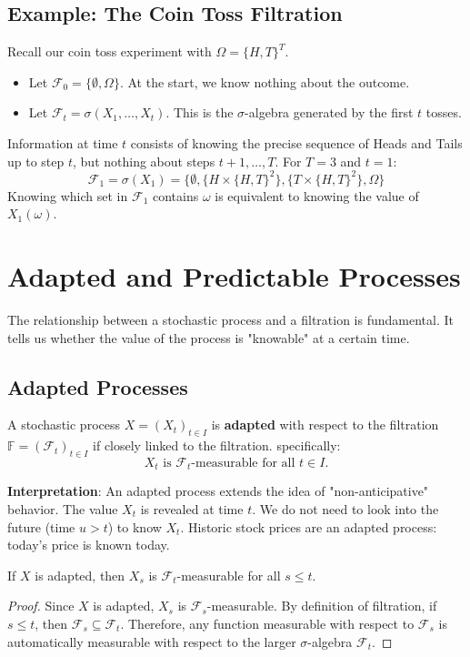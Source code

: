 \subsection{Example: The Coin Toss Filtration}
Recall our coin toss experiment with $\Omega = \{H, T\}^T$.
\begin{itemize}
    \item Let $\mathcal{F}_0 = \{ \emptyset, \Omega \}$. At the start, we know nothing about the outcome.
    \item Let $\mathcal{F}_t = \sigma(X_1, \dots, X_t)$. This is the $\sigma$-algebra generated by the first $t$ tosses.
\end{itemize}
Information at time $t$ consists of knowing the precise sequence of Heads and Tails up to step $t$, but nothing about steps $t+1, \dots, T$.
For $T=3$ and $t=1$:
\[
\mathcal{F}_1 = \sigma(X_1) = \{ \emptyset, \{H \times \{H,T\}^2\}, \{T \times \{H,T\}^2\}, \Omega \}
\]
Knowing which set in $\mathcal{F}_1$ contains $\omega$ is equivalent to knowing the value of $X_1(\omega)$.

\section{Adapted and Predictable Processes}

The relationship between a stochastic process and a filtration is fundamental. It tells us whether the value of the process is "knowable" at a certain time.

\subsection{Adapted Processes}
\begin{definition}
A stochastic process $X = (X_t)_{t \in I}$ is \textbf{adapted} with respect to the filtration $\mathbb{F} = (\mathcal{F}_t)_{t \in I}$ if closely linked to the filtration. specifically:
\[
X_t \text{ is } \mathcal{F}_t\text{-measurable for all } t \in I.
\]
\end{definition}

\textbf{Interpretation}: An adapted process extends the idea of "non-anticipative" behavior. The value $X_t$ is revealed at time $t$. We do not need to look into the future (time $u > t$) to know $X_t$. Historic stock prices are an adapted process: today's price is known today.

\begin{proposition}
If $X$ is adapted, then $X_s$ is $\mathcal{F}_t$-measurable for all $s \le t$.
\end{proposition}
\begin{proof}
Since $X$ is adapted, $X_s$ is $\mathcal{F}_s$-measurable. By definition of filtration, if $s \le t$, then $\mathcal{F}_s \subseteq \mathcal{F}_t$. Therefore, any function measurable with respect to $\mathcal{F}_s$ is automatically measurable with respect to the larger $\sigma$-algebra $\mathcal{F}_t$.
\end{proof}

